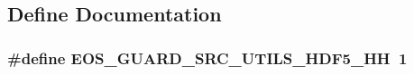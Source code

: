 \subsection{Define Documentation}
\hypertarget{hdf5_8hh_ab9d243c1633b2b4f6e51b80f8300d92e}{
\subsubsection[{EOS\_\-GUARD\_\-SRC\_\-UTILS\_\-HDF5\_\-HH}]{\setlength{\rightskip}{0pt plus 5cm}\#define EOS\_\-GUARD\_\-SRC\_\-UTILS\_\-HDF5\_\-HH~1}}
\label{hdf5_8hh_ab9d243c1633b2b4f6e51b80f8300d92e}
